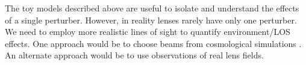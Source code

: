 The toy models described above are useful to isolate and understand the effects of a single perturber. However, in reality lenses rarely have only one perturber. We need to employ more realistic lines of sight to quantify environment/LOS effects. One approach would be to choose beams from cosmological simulations \citep[e.g.,][]{Hilbert09, Collett13, Jaroszynski12, Jaroszynski14}. An alternate approach would be to use observations of real lens fields.